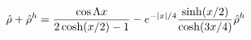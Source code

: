 \begin{equation}
\hat{\rho}+\hat{\rho}^h= {\cos \Lambda x\over
  2\cosh(x/2)-1}
- e^{-|x|/4}{\sinh (x/2)\over \cosh (3x/4)} \hat{\rho}^h
\end{equation}

